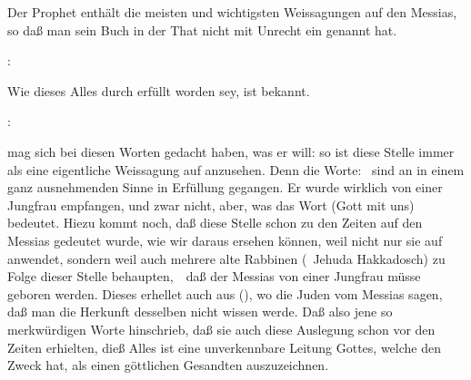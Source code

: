 Der Prophet  enthält die meisten und wichtigsten Weissagungen auf den Messias, so daß man sein Buch in der That nicht mit Unrecht ein  genannt hat.
\begin{aufza}
\item {}:  \usw\par
Wie dieses Alles durch  erfüllt worden sey, ist bekannt.
\item {}: \par
{} mag sich bei diesen Worten gedacht haben, was er will: so ist diese Stelle immer als eine eigentliche Weissagung auf  anzusehen. Denn die Worte:  \usw\ sind an  in einem ganz ausnehmenden Sinne in Erfüllung gegangen. Er wurde wirklich von einer Jungfrau empfangen, und  zwar nicht,  aber, was das Wort  (Gott mit uns) bedeutet. Hiezu kommt noch, daß diese Stelle schon zu den Zeiten  auf den Messias gedeutet wurde, wie wir daraus ersehen können, weil nicht nur  sie auf  anwendet, sondern weil auch mehrere alte Rabbinen (\zB\ Jehuda Hakkadosch) zu Folge dieser Stelle behaupten,~\ daß der Messias von einer Jungfrau müsse geboren werden. Dieses erhellet auch aus  (), wo die Juden vom Messias sagen, daß man die Herkunft desselben nicht wissen werde. Daß also  jene so merkwürdigen Worte hinschrieb, daß sie auch diese Auslegung schon vor den Zeiten  erhielten, dieß Alles ist eine unverkennbare Leitung Gottes, welche den Zweck hat,  als einen göttlichen Gesandten auszuzeichnen.

\end{aufza}
